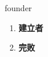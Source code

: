 
\begin{frame}
{\huge founder}
\begin{center}
\begin{enumerate}\Large
  \item \textbf{建立者}
  \item \textbf{完败}
\end{enumerate}
\end{center}
\end{frame}
